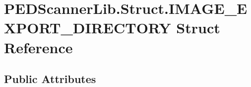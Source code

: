 \hypertarget{struct_p_e_d_scanner_lib_1_1_struct_1_1_i_m_a_g_e___e_x_p_o_r_t___d_i_r_e_c_t_o_r_y}{}\section{P\+E\+D\+Scanner\+Lib.\+Struct.\+I\+M\+A\+G\+E\+\_\+\+E\+X\+P\+O\+R\+T\+\_\+\+D\+I\+R\+E\+C\+T\+O\+RY Struct Reference}
\label{struct_p_e_d_scanner_lib_1_1_struct_1_1_i_m_a_g_e___e_x_p_o_r_t___d_i_r_e_c_t_o_r_y}
\subsection*{Public Attributes}
